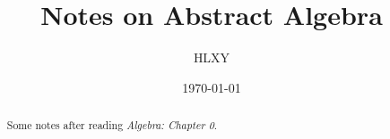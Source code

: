 \documentclass[a4paper]{article}
\title{Notes on Abstract Algebra}
\author{HLXY}
\date{\today}
\begin{document}
\maketitle
\begin{abstract}
    Some notes after reading \textit{Algebra: Chapter 0}.
\end{abstract}
\tableofcontents
\end{document}
